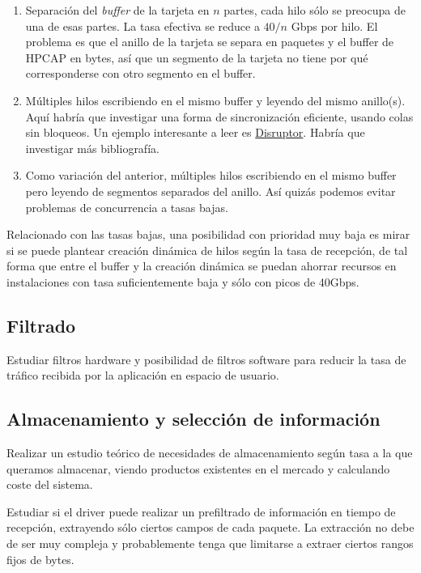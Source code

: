 \documentclass[oneside, draft]{epstfg}
\begin{document}
\begin{enumerate}
\item Separación del \textit{buffer} de la tarjeta en $n$ partes, cada hilo sólo se preocupa de una de esas partes. La tasa efectiva se reduce a $40 / n$ Gbps por hilo. El problema es que el anillo de la tarjeta se separa en paquetes y el buffer de HPCAP en bytes, así que un segmento de la tarjeta no tiene por qué corresponderse con otro segmento en el buffer.
\item Múltiples hilos escribiendo en el mismo buffer y leyendo del mismo anillo(s). Aquí habría que investigar una forma de sincronización eficiente, usando colas sin bloqueos. Un ejemplo interesante a leer es \href{http://disruptor.googlecode.com/files/Disruptor-1.0.pdf}{Disruptor}. Habría que investigar más bibliografía.
\item Como variación del anterior, múltiples hilos escribiendo en el mismo buffer pero leyendo de segmentos separados del anillo. Así quizás podemos evitar problemas de concurrencia a tasas bajas.
\end{enumerate}

Relacionado con las tasas bajas, una posibilidad con prioridad muy baja es mirar si se puede plantear creación dinámica de hilos según la tasa de recepción, de tal forma que entre el buffer y la creación dinámica se puedan ahorrar recursos en instalaciones con tasa suficientemente baja y sólo con picos de 40Gbps.

\subsection{Filtrado}

Estudiar filtros hardware y posibilidad de filtros software para reducir la tasa de tráfico recibida por la aplicación en espacio de usuario.

\subsection{Almacenamiento y selección de información}

Realizar un estudio teórico de necesidades de almacenamiento según tasa a la que queramos almacenar, viendo productos existentes en el mercado y calculando coste del sistema.

Estudiar si el driver puede realizar un prefiltrado de información en tiempo de recepción, extrayendo sólo ciertos campos de cada paquete. La extracción no debe de ser muy compleja y probablemente tenga que limitarse a extraer ciertos rangos fijos de bytes.
\end{document}
